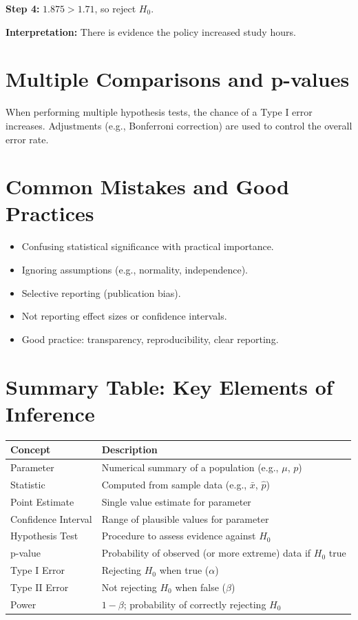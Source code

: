 \documentclass[11pt]{article}
\begin{document}
\textbf{Step 4:} $1.875 > 1.71$, so reject $H_0$.

\textbf{Interpretation:} There is evidence the policy increased study hours.

\section{Multiple Comparisons and p-values}

When performing multiple hypothesis tests, the chance of a Type I error increases. Adjustments (e.g., Bonferroni correction) are used to control the overall error rate.

\section{Common Mistakes and Good Practices}

\begin{itemize}
    \item Confusing statistical significance with practical importance.
    \item Ignoring assumptions (e.g., normality, independence).
    \item Selective reporting (publication bias).
    \item Not reporting effect sizes or confidence intervals.
    \item Good practice: transparency, reproducibility, clear reporting.
\end{itemize}

\section{Summary Table: Key Elements of Inference}

\begin{tabular}{|l|l|}
\hline
\textbf{Concept} & \textbf{Description} \\
\hline
Parameter & Numerical summary of a population (e.g., $\mu$, $p$) \\
Statistic & Computed from sample data (e.g., $\bar{x}$, $\hat{p}$) \\
Point Estimate & Single value estimate for parameter \\
Confidence Interval & Range of plausible values for parameter \\
Hypothesis Test & Procedure to assess evidence against $H_0$ \\
p-value & Probability of observed (or more extreme) data if $H_0$ true \\
Type I Error & Rejecting $H_0$ when true ($\alpha$) \\
Type II Error & Not rejecting $H_0$ when false ($\beta$) \\
Power & $1-\beta$; probability of correctly rejecting $H_0$ \\
\hline
\end{tabular}
\end{document}
